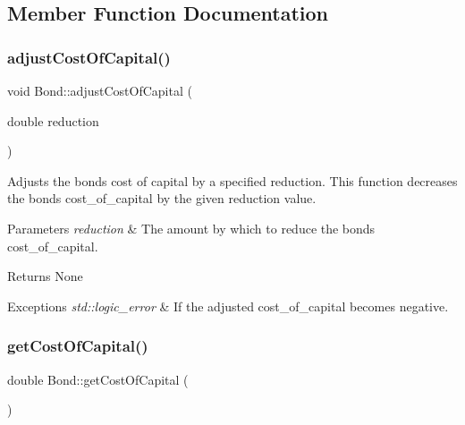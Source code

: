 \subsection{Member Function Documentation}
\mbox{\label{classBond_ad4e613d485dd3f1de25c8faf21faec35}} 
\subsubsection{\texorpdfstring{adjust\+Cost\+Of\+Capital()}{adjustCostOfCapital()}}
{\footnotesize\ttfamily void Bond\+::adjust\+Cost\+Of\+Capital (\begin{DoxyParamCaption}\item[{double}]{reduction }\end{DoxyParamCaption})}



Adjusts the bond\textquotesingle{}s cost of capital by a specified reduction. This function decreases the bond\textquotesingle{}s {\ttfamily cost\+\_\+of\+\_\+capital} by the given reduction value. 


\begin{DoxyParams}{Parameters}
{\em reduction} & The amount by which to reduce the bond\textquotesingle{}s {\ttfamily cost\+\_\+of\+\_\+capital}.\\
\hline
\end{DoxyParams}
\begin{DoxyReturn}{Returns}
None
\end{DoxyReturn}

\begin{DoxyExceptions}{Exceptions}
{\em std\+::logic\+\_\+error} & If the adjusted {\ttfamily cost\+\_\+of\+\_\+capital} becomes negative. \\
\hline
\end{DoxyExceptions}
\mbox{\label{classBond_aa3773136ec3327a88226859ea950a7b3}} 
\subsubsection{\texorpdfstring{get\+Cost\+Of\+Capital()}{getCostOfCapital()}}
{\footnotesize\ttfamily double Bond\+::get\+Cost\+Of\+Capital (\begin{DoxyParamCaption}{ }\end{DoxyParamCaption})}



